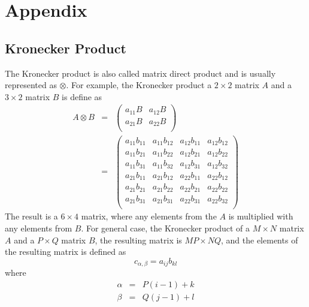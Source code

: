 \chapter{Appendix}
\label{chap:Appendix}
\section{Kronecker Product}\label{appen:Kronecker}
The Kronecker product is also called matrix direct product and is
usually represented as $\otimes$. For example, the Kronecker product
a $2\times2$ matrix $A$ and a $3\times2$ matrix $B$ is define as
\begin{eqnarray}\label{Kronecker}
    A\otimes B &=& \left(%
\begin{array}{cc}
  a_{11}B & a_{12}B \\
  a_{21}B & a_{22}B \\
\end{array}%
\right)\nonumber\\
&=&\left(%
\begin{array}{cccc}
  a_{11}b_{11} & a_{11}b_{12} & a_{12}b_{11} & a_{12}b_{12} \\
  a_{11}b_{21} & a_{11}b_{22} & a_{12}b_{21} & a_{12}b_{22} \\
  a_{11}b_{31} & a_{11}b_{32} & a_{12}b_{31} & a_{12}b_{32} \\
  a_{21}b_{11} & a_{21}b_{12} & a_{22}b_{11} & a_{22}b_{12} \\
  a_{21}b_{21} & a_{21}b_{22} & a_{22}b_{21} & a_{22}b_{22} \\
  a_{21}b_{31} & a_{21}b_{31} & a_{22}b_{31} & a_{22}b_{32} \\
\end{array}%
\right)
\end{eqnarray}
The result is a $6\times4$ matrix, where any elements from the $A$
is multiplied with any elements from $B$. For general case, the
Kronecker product of a $M\times N$ matrix $A$ and a $P\times Q$
matrix $B$, the resulting matrix is $MP\times NQ$, and the elements
of the resulting matrix is defined as
\begin{equation}\label{Kronecker2}
    c_{\alpha,\beta}=a_{ij}b_{kl}
\end{equation}
where
\begin{eqnarray}
  \alpha &=& P(i-1)+k \\
  \beta &=& Q(j-1)+l
\end{eqnarray}
